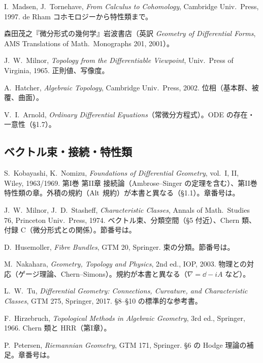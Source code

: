 \begin{description}[leftmargin=2.2em,labelindent=0pt,itemsep=3pt]
\item[{[MT]}] I.~Madsen, J.~Tornehave, \emph{From Calculus to Cohomology}, Cambridge Univ.\ Press, 1997. de Rham コホモロジーから特性類まで。
\item[{[Mo]}] 森田茂之『微分形式の幾何学』岩波書店（英訳 \emph{Geometry of Differential Forms}, AMS Translations of Math.\ Monographs 201, 2001）。
\item[{[Mi]}] J.~W.~Milnor, \emph{Topology from the Differentiable Viewpoint}, Univ.\ Press of Virginia, 1965. 正則値、写像度。
\item[{[Ha]}] A.~Hatcher, \emph{Algebraic Topology}, Cambridge Univ.\ Press, 2002. 位相（基本群、被覆、曲面）。
\item[{[Ar]}] V.~I.~Arnold, \emph{Ordinary Differential Equations}（常微分方程式）。ODE の存在・一意性（§1.7）。
\end{description}

\subsection*{ベクトル束・接続・特性類}
\begin{description}[leftmargin=2.2em,labelindent=0pt,itemsep=3pt]
\item[{[KN]}] S.~Kobayashi, K.~Nomizu, \emph{Foundations of Differential Geometry}, vol.~I, II, Wiley, 1963/1969. 第I巻 第II章 接続論（Ambrose--Singer の定理を含む）、第II巻 特性類の章。外積の規約（$\operatorname{Alt}$ 規約）が本書と異なる（§1.1）。章番号は\tQ。
\item[{[MS]}] J.~W.~Milnor, J.~D.~Stasheff, \emph{Characteristic Classes}, Annals of Math.\ Studies 76, Princeton Univ.\ Press, 1974. ベクトル束、分類空間（§5 付近）、Chern 類、付録 C（微分形式との関係）。節番号は\tQ。
\item[{[Hu]}] D.~Husemoller, \emph{Fibre Bundles}, GTM 20, Springer. 束の分類。節番号は\tQ。
\item[{[Na]}] M.~Nakahara, \emph{Geometry, Topology and Physics}, 2nd ed., IOP, 2003. 物理との対応（ゲージ理論、Chern--Simons）。規約が本書と異なる（$\nabla=\dd-iA$ など）。
\item[{[Tu2]}] L.~W.~Tu, \emph{Differential Geometry: Connections, Curvature, and Characteristic Classes}, GTM 275, Springer, 2017. §8--§10 の標準的な参考書。
\item[{[Hi]}] F.~Hirzebruch, \emph{Topological Methods in Algebraic Geometry}, 3rd ed., Springer, 1966. Chern 類と HRR（第I章）\tQ。
\item[{[Pe]}] P.~Petersen, \emph{Riemannian Geometry}, GTM 171, Springer. §6 の Hodge 理論の補足。章番号は\tQ。
\end{description}

